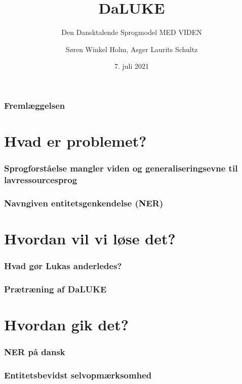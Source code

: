 \documentclass{beamer}
\title{DaLUKE}
\subtitle{
    Den Dansktalende Sprogmodel MED VIDEN
}
\author[Søren Holm, Asger Schultz]{Søren Winkel Holm, Asger Laurits Schultz}
\institute[DTU]{Danmarks Tekniske Universitet}
\date{7. juli 2021}
\begin{document}
\begin{frame}
    \titlepage
\end{frame}



\begin{frame}
    \frametitle{Fremlæggelsen}
    \footnotesize
    \tableofcontents
\end{frame}

\section{Hvad er problemet?}
\begin{frame}
    \frametitle{Sprogforståelse mangler viden og generaliseringsevne til lavressourcesprog}
\end{frame}

\begin{frame}
    \frametitle{Navngiven entitetsgenkendelse (NER)}
\end{frame}

\section{Hvordan vil vi løse det?}
\begin{frame}
    \frametitle{Hvad gør Lukas anderledes?}
\end{frame}

\begin{frame}
    \frametitle{Prætræning af DaLUKE}
\end{frame}

\section{Hvordan gik det?}
\begin{frame}
    \frametitle{NER på dansk}
\end{frame}

\begin{frame}
    \frametitle{Entitetsbevidst selvopmærksomhed}
\end{frame}
\end{document}
